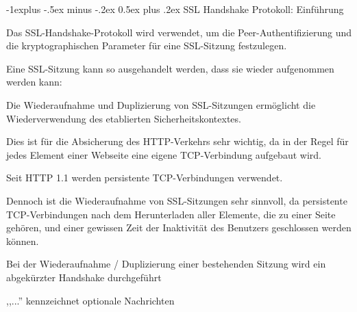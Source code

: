 \documentclass[a4paper]{article}
\makeatletter
\renewcommand{\subsection}{\@startsection{subsection}{2}{0mm}%
 {-1explus -.5ex minus -.2ex}%
 {0.5ex plus .2ex}%
 {\normalfont\normalsize\bfseries}}
\makeatother
\begin{document}
\begin{multicols}{3}
      \subsection{SSL Handshake Protokoll: Einführung}
      \begin{itemize*}
            \item Das SSL-Handshake-Protokoll wird verwendet, um die Peer-Authentifizierung und die kryptographischen Parameter für eine SSL-Sitzung festzulegen.
            \item Eine SSL-Sitzung kann so ausgehandelt werden, dass sie wieder aufgenommen werden kann:
            \begin{itemize*}
                  \item Die Wiederaufnahme und Duplizierung von SSL-Sitzungen ermöglicht die Wiederverwendung des etablierten Sicherheitskontextes.
                  \item Dies ist für die Absicherung des HTTP-Verkehrs sehr wichtig, da in der Regel für jedes Element einer Webseite eine eigene TCP-Verbindung aufgebaut wird.
                  \begin{itemize*}
                        \item Seit HTTP 1.1 werden persistente TCP-Verbindungen verwendet.
                        \item Dennoch ist die Wiederaufnahme von SSL-Sitzungen sehr sinnvoll, da persistente TCP-Verbindungen nach dem Herunterladen aller Elemente, die zu einer Seite gehören, und einer gewissen Zeit der Inaktivität des Benutzers geschlossen werden können.
                  \end{itemize*}
                  \item Bei der Wiederaufnahme / Duplizierung einer bestehenden Sitzung wird ein abgekürzter Handshake durchgeführt
            \end{itemize*}
      \end{itemize*}

      ,,...'' kennzeichnet optionale Nachrichten


\end{multicols}
\end{document}
